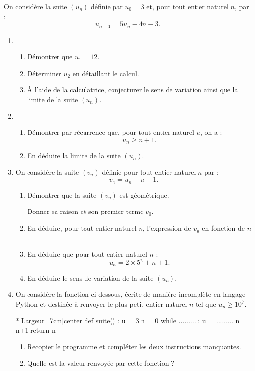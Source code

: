 On considère la suite $\left(u_n\right)$ définie par $u_0=3$ et, pour tout entier naturel $n$, par :%
\[ u_{n+1}=5u_n-4n-3. \]
%
\begin{enumerate}
	\item 
	\begin{enumerate}
		\item Démontrer que $u_1=12$.
		\item Déterminer $u_2$ en détaillant le calcul.
		\item À l'aide de la calculatrice, conjecturer le sens de variation ainsi que la limite de la suite $\left(u_n\right)$.
	\end{enumerate}
	\item 
	\begin{enumerate}
		\item Démontrer par récurrence que, pour tout entier naturel $n$, on a :%
		\[ u_n \geqslant n+1. \]
		\item En déduire la limite de la suite $\left(u_n\right)$.
	\end{enumerate}
	\item On considère la suite $\left(v_n\right)$ définie pour tout entier naturel $n$ par :%
	\[ v_n = u_n - n - 1. \]
	\begin{enumerate}
		\item Démontrer que la suite $\left(v_n\right)$ est géométrique.
		
		Donner sa raison et son premier terme $v_0$.
		\item En déduire, pour tout entier naturel $n$, l'expression de $v_n$ en fonction de $n$.
		\item En déduire que pour tout entier naturel $n$ :%
		\[ u_n = 2 \times 5^n + n + 1. \]
		\item En déduire le sens de variation de la suite $\left(u_n\right)$.
	\end{enumerate}
	\item On considère la fonction ci-dessous, écrite de manière incomplète en langage Python et destinée à renvoyer le plus petit entier naturel $n$ tel que $u_n \geqslant 10^7$.
	
\begin{CodePythonLstAlt}*[Largeur=7cm]{center}
def suite() :
	u = 3
	n = 0
	while ......... :
		u = .........
		n = n+1
	return n
\end{CodePythonLstAlt}
	\begin{enumerate}
		\item Recopier le programme et compléter les deux instructions manquantes.
		\item Quelle est la valeur renvoyée par cette fonction ?
	\end{enumerate}
\end{enumerate}
